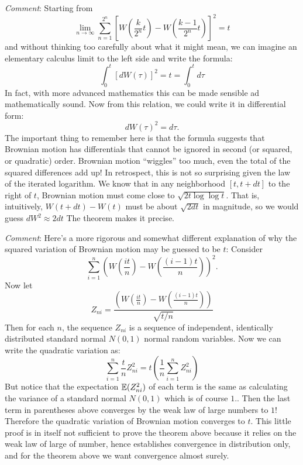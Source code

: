 \begin{problem}
 {\it Comment}:  Starting from
  $$
    \lim_{n \to \infty}
             \sum_{n=1}^{2^n} 
               \left[ 
                  W\left( \frac{k}{2^n} t \right) - 
                  W\left( \frac{k-1}{2^n} t \right)
               \right]^2
           = t
  $$
  and without thinking too carefully about what it might mean, we can
  imagine an elementary calculus limit to the left side and write the
  formula:
  $$
    \int_0^t [ dW(\tau) ]^2 = t = \int_0^t d\tau
  $$
  In fact, with more advanced mathematics this can be made sensible ad
  mathematically sound.  Now from this relation, we could write it in
  differential form:
  $$
    dW(\tau)^2 = d\tau.
  $$
  \ni The important thing to remember here is that the formula suggests
  that Brownian motion has differentials that cannot be ignored in
  second (or squared, or quadratic) order.  Brownian motion ``wiggles''
  too much, even the total of the squared differences add up!  In
  retrospect, this is not so surprising given the law of the iterated
  logarithm.  We know that in any neighborhood $[t, t + dt]$ to the
  right of $t$, Brownian motion must come close to $\sqrt{2t \log \log
  t}$.  That is, intuitively, $W(t+dt) - W(t)$ must be about $\sqrt{2
  dt}$ in magnitude, so we would guess $dW^2 \approx 2dt$  The theorem
  makes it precise.
\end{problem} 
\begin{solution} 

\end{solution}

\begin{problem}
 {\it Comment}:
  Here's a more rigorous and somewhat different explanation of why the squared 
  variation of Brownian motion may be guessed to be $t$:  Consider
  $$
      \sum_{i=1}^{n} \left( W\left( \frac{it}{n} \right) - W\left(
      \frac{(i-1)t}{n} \right)  \right)^2.
  $$
  Now let
  $$
  Z_{ni} = \frac{ \left( W\left( \frac{it}{n} \right) - W\left(
      \frac{(i-1)t}{n} \right) \right) }{ \sqrt{t/n} }
  $$
  Then for each $n$, the sequence $Z_{ni}$ is a sequence of independent,
  identically distributed standard normal $N(0,1)$ normal random
  variables.
  Now we can write the quadratic variation as:
  $$
      \sum_{i=1}^{n} \frac{t}{n} Z_{ni}^2 = t \left( \frac{1}{n}
      \sum_{i=1}^{n} Z_{ni}^2 \right)
  $$
  But notice that the expectation $\mathbb{E}(Z_{ni}^2)$ of each term is the same
  as calculating the variance of a standard normal $N(0,1)$ which is of
  course $1$..  Then the last term in parentheses above converges by the weak law of
  large numbers to $1$!  Therefore the quadratic variation of Brownian
  motion converges to $t$.  This little proof is in itself not
  sufficient to prove the theorem above because it relies on the weak
  law of large of number, hence establishes convergence in distribution
  only, and for the theorem above we want convergence almost surely.
\end{problem} 
\begin{solution} 

\end{solution}

